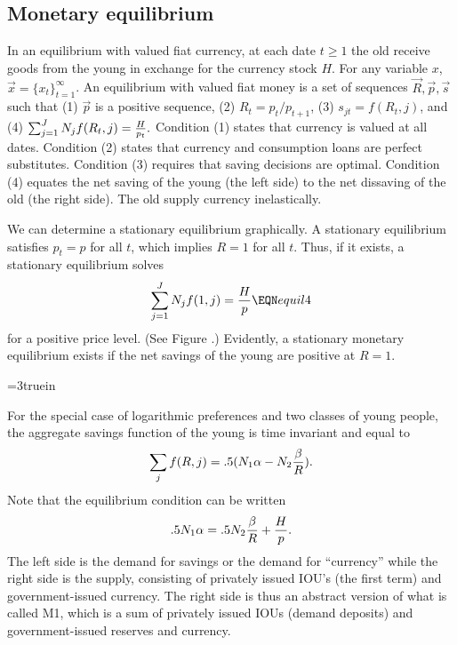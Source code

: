 \subsection{Monetary equilibrium}

In an equilibrium with valued fiat currency, at each
date $t \geq 1$ the old receive goods from the young
in exchange for the currency stock $H$.
 For any variable $x$,  $\vec x = \{x_t\}_{t=1}^\infty$.
  An equilibrium with valued fiat money is a set of
sequences $\vec R, \vec p, \vec s$
such that (1) $\vec p$ is a positive sequence, (2) $R_t =p_t / p_{t+1}$,
(3) $s_{jt} = f( R_t,j)$,  and  (4)
$ \sum_{j=1}^J N_j f(R_t, j) = {H \over p_t}.$
Condition (1) states that currency is valued at all dates.
Condition (2) states  that currency and consumption loans
are perfect substitutes.  Condition (3) requires that saving
decisions are optimal. Condition (4) equates the
net saving of the young (the left side) to the net dissaving
of the old (the right side). The old supply currency inelastically.

We can determine a stationary equilibrium graphically.  A stationary
equilibrium satisfies $p_t =p$ for all $t$, which implies
$R =1$ for all $t$.  Thus, if it exists, a stationary equilibrium
solves
$$ \sum_{j=1}^J N_j f(1, j) = {H \over p}  \EQN equil4
 $$
for a positive price level. (See Figure .) %
Evidently, a stationary monetary equilibrium exists if the net
savings of the young are positive at $R=1$.


\centerline{\epsfxsize=3truein}
\caption{The intersection of the aggregate savings function with a horizontal
line at $R=1$ determines  a stationary equilibrium value of the price level,
if positive.}
\endfigure

For the special case of logarithmic preferences and two
classes of young people, the aggregate savings function of the young is
time invariant and equal to
$$ \sum_j f(R,j) = .5(N_1 \alpha - N_2{\beta  \over R}). $$
Note that the equilibrium condition  can be written
$$ .5 N_1 \alpha = .5 N_2 {\beta  \over R} + {H  \over p}. $$
The left side is the demand for savings or the demand
for ``currency'' while the right side is the supply, consisting
of privately issued IOU's (the first term) and
government-issued currency.  The right side is thus
an abstract version of what is called  M1, which is a sum of privately
issued IOUs (demand deposits) and government-issued reserves and
currency.%

